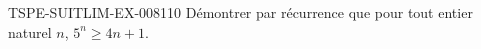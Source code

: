 \begin{exercice}{TSPE-SUITLIM-EX-008}{1}{10}
Démontrer par récurrence que pour tout entier naturel $n$, $5^n \geq 4n + 1$.
\end{exercice}
